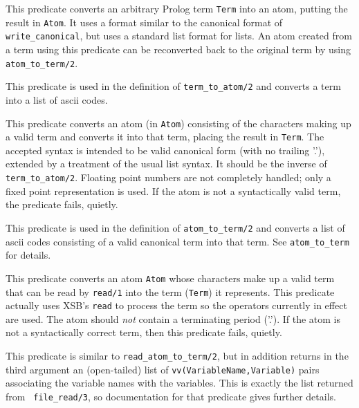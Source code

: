 \begin{description}

This predicate converts an arbitrary Prolog term {\tt Term} into an
atom, putting the result in {\tt Atom}.  It uses a format similar to
the canonical format of {\tt write\_canonical}, but uses a standard
list format for lists.  An atom created from a term using this
predicate can be reconverted back to the original term by using {\tt
atom\_to\_term/2}.


This predicate is used in the definition of {\tt term\_to\_atom/2} and 
converts a term into a list of ascii codes.


This predicate converts an atom (in {\tt Atom}) consisting of the
characters making up a valid term and converts it into that term,
placing the result in {\tt Term}.  The accepted syntax is intended to
be valid canonical form (with no trailing '.'), extended by a
treatment of the usual list syntax.  It should be the inverse of {\tt
term\_to\_atom/2}.  Floating point numbers are not completely handled; 
only a fixed point representation is used.  If the atom is not a
syntactically valid term, the predicate fails, quietly.


This predicate is used in the definition of {\tt atom\_to\_term/2} and 
converts a list of ascii codes consisting of a valid canonical term
into that term.  See {\tt atom\_to\_term} for details.


This predicate converts an atom {\tt Atom} whose characters make up a
valid term that can be read by {\tt read/1} into the term ({\tt Term})
it represents.  This predicate actually uses XSB's {\tt read} to
process the term so the operators currently in effect are used.  The
atom should {\em not} contain a terminating period ('.'). If the atom
is not a syntactically correct term, then this predicate fails,
quietly.


This predicate is similar to {\tt read\_atom\_to\_term/2}, but in
addition returns in the third argument an (open-tailed) list of
{\tt vv(VariableName,Variable)} pairs associating the variable names
with the variables.  This is exactly the list returned from {\tt
file\_read/3}, so documentation for that predicate gives further details.

\end{description}



